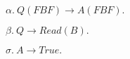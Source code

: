 

$ \alpha.\  Q(FBF) \rightarrow A(FBF). $

$ \beta.\  Q \rightarrow Read(B). $

$ \sigma.\  A \rightarrow True. $




\bye
